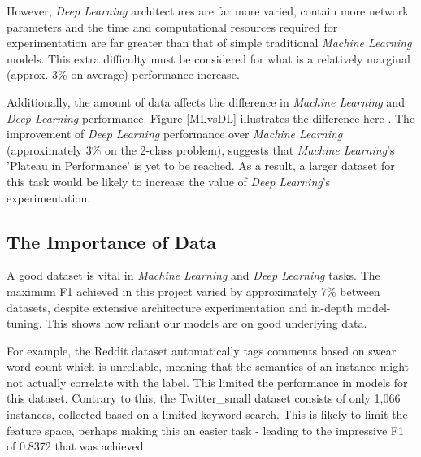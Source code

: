 \documentclass[12pt,a4paper]{article}
\begin{document}
However, \textit{Deep Learning} architectures are far more varied, contain more network parameters and the time and computational resources required for experimentation are far greater than that of simple traditional \textit{Machine Learning} models. This extra difficulty must be considered for what is a relatively marginal (approx. 3\% on average) performance increase.

Additionally, the amount of data affects the difference in \textit{Machine Learning} and \textit{Deep Learning} performance. Figure \ref{MLvsDL} illustrates the difference here \cite{BuildDeeper}. The improvement of \textit{Deep Learning} performance over \textit{Machine Learning} (approximately 3\% on the 2-class problem), suggests that \textit{Machine Learning}'s 'Plateau in Performance' is yet to be reached. As a result, a larger dataset for this task would be likely to increase the value of \textit{Deep Learning}'s experimentation.


\subsection{The Importance of Data}

A good dataset is vital in \textit{Machine Learning} and \textit{Deep Learning} tasks. The maximum F1 achieved in this project varied by approximately 7\% between datasets, despite extensive architecture experimentation and in-depth model-tuning. This shows how reliant our models are on good underlying data. 

For example, the Reddit dataset automatically tags comments based on swear word count which is unreliable, meaning that the semantics of an instance might not actually correlate with the label. This limited the performance in models for this dataset. Contrary to this, the Twitter\_small dataset consists of only 1,066 instances, collected based on a limited keyword search. This is likely to limit the feature space, perhaps making this an easier task - leading to the impressive F1 of 0.8372 that was achieved.
\end{document}
